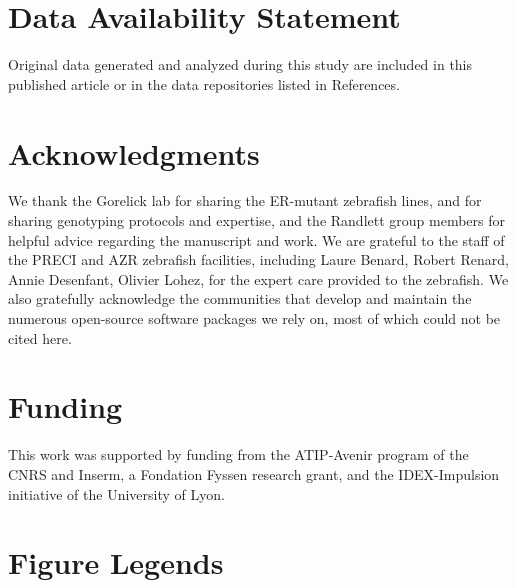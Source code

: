 \documentclass[9.5pt,lineno]{RandlettLab_elife}
\begin{document}
{\section{Data Availability Statement}

Original data generated and analyzed during this study are included in this published article or in the data repositories listed in References.

\section{Acknowledgments}

We thank the Gorelick lab for sharing the ER-mutant zebrafish lines, and for sharing genotyping protocols and expertise, and the Randlett group members for helpful advice regarding the manuscript and work.
We are grateful to the staff of the PRECI and AZR zebrafish facilities, including Laure Benard, Robert Renard, Annie Desenfant, Olivier Lohez, for the expert care provided to the zebrafish. 
We also gratefully acknowledge the communities that develop and maintain the numerous open-source software packages we rely on, most of which could not be cited here.


\section{Funding}
This work was supported by funding from the ATIP-Avenir program of the CNRS and Inserm, a Fondation Fyssen research grant, and the IDEX-Impulsion initiative of the University of Lyon.



\newpage

\section{Figure Legends}
\newpage

\begin{figure}
\internallinenumbers

\begin{center}


\end{center}
\end{figure}}
\end{document}
